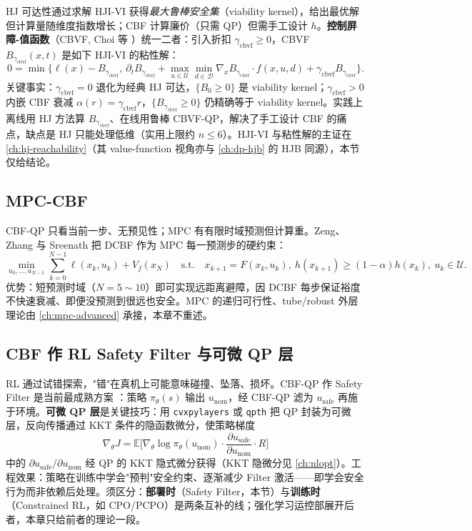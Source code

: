 HJ 可达性通过求解 HJI-VI 获得\emph{最大鲁棒安全集}（viability kernel），给出最优解但计算量随维度指数增长；CBF 计算廉价（只需 QP）但需手工设计 $h$。\textbf{控制屏障-值函数}（CBVF, Choi 等 \cite{choi2021cbvf}）统一二者：引入折扣 $\gamma_{\mathrm{cbvf}}\ge0$，CBVF $B_{\gamma_{\mathrm{cbvf}}}(x,t)$ 是如下 HJI-VI 的粘性解：
\begin{equation}
0=\min\Big\{\ell(x)-B_{\gamma_{\mathrm{cbvf}}},\ \partial_tB_{\gamma_{\mathrm{cbvf}}}+\max_{u\in\mathcal U}\min_{d\in\mathcal D}\nabla_xB_{\gamma_{\mathrm{cbvf}}}\cdot f(x,u,d)+\gamma_{\mathrm{cbvf}}B_{\gamma_{\mathrm{cbvf}}}\Big\}.
\label{eq:cbvf}
\end{equation}
关键事实：$\gamma_{\mathrm{cbvf}}=0$ 退化为经典 HJ 可达，$\{B_0\ge0\}$ 是 viability kernel；$\gamma_{\mathrm{cbvf}}>0$ 内嵌 CBF 衰减 $\alpha(r)=\gamma_{\mathrm{cbvf}}r$，$\{B_{\gamma_{\mathrm{cbvf}}}\ge0\}$ 仍精确等于 viability kernel。实践上离线用 HJ 方法算 $B_{\gamma_{\mathrm{cbvf}}}$、在线用鲁棒 CBVF-QP，解决了手工设计 CBF 的痛点，缺点是 HJ 只能处理低维（实用上限约 $n\le6$）。HJI-VI 与粘性解的主证在 \cref{ch:hj-reachability}（其 value-function 视角亦与 \cref{ch:dp-hjb} 的 HJB 同源），本节仅给结论。

\subsection{MPC-CBF}

CBF-QP 只看当前一步、无预见性；MPC 有有限时域预测但计算重。Zeng、Zhang 与 Sreenath \cite{zeng2021mpccbf} 把 DCBF 作为 MPC 每一预测步的硬约束：
\[
\min_{u_0,\dots,u_{N-1}}\sum_{k=0}^{N-1}\ell(x_k,u_k)+V_f(x_N)\quad\text{s.t.}\quad x_{k+1}=F(x_k,u_k),\ h(x_{k+1})\ge(1-\alpha)h(x_k),\ u_k\in\mathcal U.
\]
优势：短预测时域（$N=5\sim10$）即可实现远距离避障，因 DCBF 每步保证裕度不快速衰减、即便没预测到很远也安全。MPC 的递归可行性、tube/robust 外层理论由 \cref{ch:mpc-advanced} 承接，本章不重述。

\subsection{CBF 作 RL Safety Filter 与可微 QP 层}

RL 通过试错探索，"错"在真机上可能意味碰撞、坠落、损坏。CBF-QP 作 Safety Filter 是当前最成熟方案 \cite{cheng2019rlcbf}：策略 $\pi_\theta(s)$ 输出 $u_{\mathrm{nom}}$，经 CBF-QP 滤为 $u_{\mathrm{safe}}$ 再施于环境。\textbf{可微 QP 层}是关键技巧：用 \texttt{cvxpylayers} \cite{agrawal2019cvxpylayers} 或 \texttt{qpth} \cite{amos2017optnet} 把 QP 封装为可微层，反向传播通过 KKT 条件的隐函数微分，使策略梯度
\[
\nabla_\theta J=\mathbb E\Big[\nabla_\theta\log\pi_\theta(u_{\mathrm{nom}})\cdot\frac{\partial u_{\mathrm{safe}}}{\partial u_{\mathrm{nom}}}\cdot R\Big]
\]
中的 $\partial u_{\mathrm{safe}}/\partial u_{\mathrm{nom}}$ 经 QP 的 KKT 隐式微分获得（KKT 隐微分见 \cref{ch:nlopt}）。工程效果：策略在训练中学会"预判"安全约束、逐渐减少 Filter 激活——即学会安全行为而非依赖后处理。须区分：\textbf{部署时}（Safety Filter，本节）与\textbf{训练时}（Constrained RL，如 CPO/PCPO）是两条互补的线；强化学习运控部展开后者，本章只给前者的理论一段。

